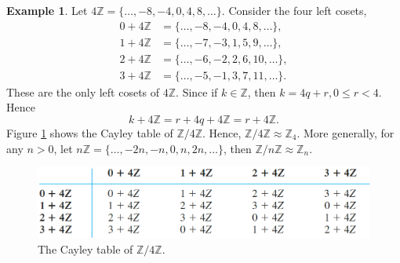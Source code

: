 \documentclass{article}
\theoremstyle{definition}
\newtheorem{example}{Example}[section]
\begin{document}
     \begin{example}
        Let $4\mathbb{Z}=\{\dots,-8,-4,0,4,8,\dots\}$. Consider the four left cosets,
        \begin{align*}
            0+4\mathbb{Z} &= \{\dots,-8,-4,0,4,8,\dots\}, \\
            1 + 4\mathbb{Z} &= \{\dots,-7,-3,1,5,9,\dots\}, \\
            2 + 4\mathbb{Z} &= \{\dots,-6,-2,2,6,10,\dots\}, \\
            3 + 4 \mathbb{Z} &= \{\dots,-5,-1,3,7,11,\dots\}.
        \end{align*}
        These are the only left cosets of $4\mathbb{Z}$. Since if $k \in \mathbb{Z}$, then $k = 4q+r, 0 \leq r < 4$. Hence
        \begin{equation*}
            k+4\mathbb{Z} = r+4q+4\mathbb{Z} = r+4\mathbb{Z}.
        \end{equation*}
        Figure \ref{example9.10} shows the Cayley table of $\mathbb{Z}/4\mathbb{Z}$. Hence, $\mathbb{Z}/4\mathbb{Z} \approx \mathbb{Z}_4$. More generally, for any $n>0$, let $n\mathbb{Z} = \{\dots,-2n,-n,0,n,2n,\dots\}$, then $\mathbb{Z}/n\mathbb{Z} \approx \mathbb{Z}_n$.
        
        \begin{figure}[!htbp]
            \centering
            \includegraphics[width=0.9\linewidth]{figures/example 9.10.png}
            \caption{The Cayley table of $\mathbb{Z}/4\mathbb{Z}$.}
            \label{example9.10}
        \end{figure}
     \end{example}
     
\end{document}
